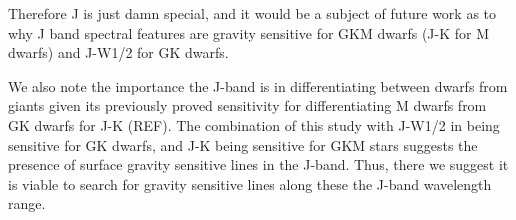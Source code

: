 Therefore J is just damn special, and it would be a subject of future work as to why J band spectral features are gravity sensitive for GKM dwarfs (J-K for M dwarfs) and J-W1/2 for GK dwarfs.

We also note the importance the J-band is in differentiating between dwarfs from giants given its previously proved sensitivity for differentiating M dwarfs from GK dwarfs for J-K (REF). The combination of this study with J-W1/2 in being sensitive for GK dwarfs, and J-K being sensitive for GKM stars suggests the presence of surface gravity sensitive lines in the J-band. Thus, there we suggest it is viable to search for gravity sensitive lines along these the J-band wavelength range.